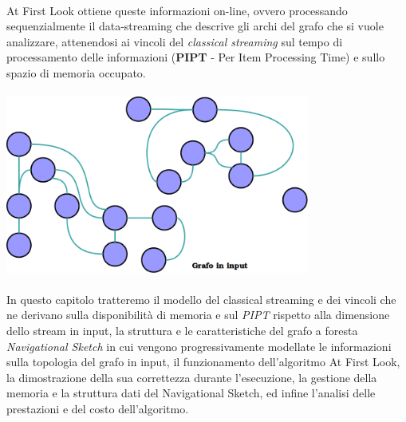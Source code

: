 \documentclass[a4paper,11pt]{report}
\begin{document}
\paragraph{}
At First Look ottiene queste informazioni on-line, ovvero processando sequenzialmente il data-streaming che descrive gli archi del grafo che
si vuole analizzare, attenendosi  
ai vincoli del \emph{classical streaming} sul tempo di processamento delle informazioni (\textbf{PIPT} - Per Item Processing Time) e sullo
spazio di memoria occupato.
\paragraph{}
\centerline{\includegraphics[width=100mm]{images/grafo_input_notit.png}} 
\paragraph{}
In questo capitolo tratteremo il modello del classical streaming e dei vincoli che ne derivano sulla disponibilità di memoria e sul
\emph{PIPT} rispetto alla
dimensione dello stream in input, la struttura e le caratteristiche del grafo a foresta \emph{Navigational Sketch} in cui vengono
progressivamente modellate 
le informazioni sulla topologia del grafo in input, il funzionamento dell'algoritmo At First Look, la dimostrazione della sua correttezza
durante l'esecuzione,
la gestione della memoria e la struttura dati del Navigational Sketch, ed infine l'analisi delle prestazioni e del costo dell'algoritmo.
\end{document}
